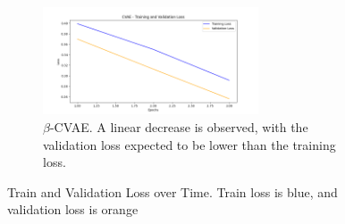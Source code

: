 \begin{figure}[!htbp]
  \vspace{0.5cm}
  
  \begin{subfigure}{\textwidth}
    \centering
    \includegraphics[width=0.7\textwidth]{figures/losses/cvae.png}
    \caption{$\beta$-CVAE. A linear decrease is observed, with the validation loss expected to be lower than the training loss.}
  \end{subfigure}
  
  \caption{Train and Validation Loss over Time. Train loss is blue, and validation loss is orange}
  \label{fig:losses}
\end{figure}

\clearpage

